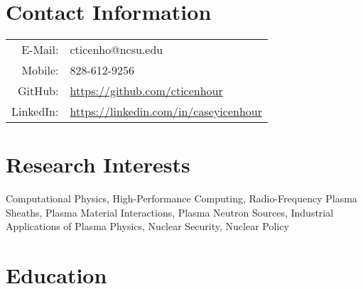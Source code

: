 \documentclass{article}
\title{\vspace{-2.5em}{\huge \textbf{Casey Icenhour}}\vspace{-3em}}
\date{} %
\begin{document}
	
\maketitle

\section*{Contact Information}

\begin{tabularx}{\textwidth}{r l}
	\hspace{3em} E-Mail:  & \hspace{2em} cticenho@ncsu.edu \\
	\hspace{3em} Mobile: & \hspace{2em} 828-612-9256 \\
	\hspace{3em} GitHub: & \hspace{2em} \url{https://github.com/cticenhour} \\
	\hspace{3em} LinkedIn: & \hspace{2em} \url{https://linkedin.com/in/caseyicenhour}
\end{tabularx}

\section*{Research Interests}

\hspace{0.07\textwidth} \begin{minipage}[t][2em][s]{0.92\textwidth}
	Computational Physics, High-Performance Computing, Radio-Frequency Plasma Sheaths, Plasma Material Interactions, Plasma Neutron Sources, Industrial Applications of Plasma Physics, Nuclear Security, Nuclear Policy
\end{minipage}

\section*{Education}
\end{document}
